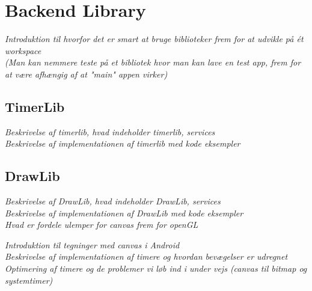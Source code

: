 \section{Backend Library}
\textit{Introduktion til hvorfor det er smart at bruge biblioteker frem for at udvikle på ét workspace\\
(Man kan nemmere teste på et bibliotek hvor man kan lave en test app, frem for at være afhængig af at "main" appen virker)}

\subsection{TimerLib}
\textit{Beskrivelse af timerlib, hvad indeholder timerlib, services\\
Beskrivelse af implementationen af timerlib med kode eksempler}

\subsection{DrawLib}
\textit{Beskrivelse af DrawLib, hvad indeholder DrawLib, services\\
Beskrivelse af implementationen af DrawLib med kode eksempler\\
Hvad er fordele ulemper for canvas frem for openGL}


\textit{Introduktion til tegninger med canvas i Android\\
Beskrivelse af implementationen af timere og hvordan bevægelser er udregnet\\
Optimering af timere og de problemer vi løb ind i under vejs (canvas til bitmap og systemtimer)}